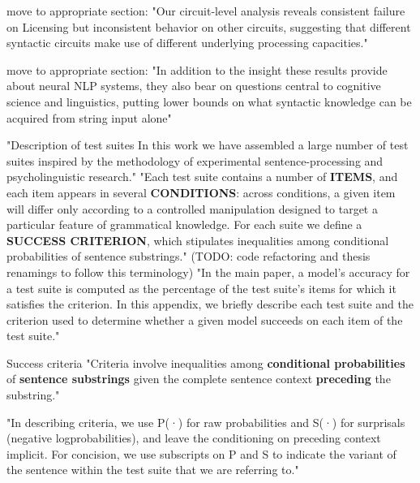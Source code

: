 
move to appropriate section: "Our circuit-level analysis reveals consistent failure on Licensing but inconsistent behavior on other
circuits, suggesting that different syntactic circuits
make use of different underlying processing capacities."  \citep{hu2020systematic} 

move to appropriate section: "In addition to the insight these results provide
about neural NLP systems, they also bear on questions central to cognitive science and linguistics, putting lower bounds on what syntactic knowledge
can be acquired from string input alone"  \citep{hu2020systematic} 

"Description of test suites In this work we have assembled a large number of
test suites inspired by the methodology of experimental sentence-processing and psycholinguistic research." \citep{hu2020systematic} 
"Each test suite contains a number of \textbf{ITEMS}, and each item appears in several \textbf{CONDITIONS}: across conditions, a given item will differ only according to a controlled manipulation designed to target a particular feature of grammatical  knowledge. For each suite we define a \textbf{SUCCESS
	CRITERION}, which stipulates inequalities among conditional probabilities of sentence substrings."\citep{hu2020systematic} 
(TODO: code refactoring and thesis renamings to follow this terminology)
"In the main paper, a model’s accuracy for a test
suite is computed as the percentage of the test
suite’s items for which it satisfies the criterion. In
this appendix, we briefly describe each test suite
and the criterion used to determine whether a given
model succeeds on each item of the test suite." \citep{hu2020systematic} 

Success criteria
"Criteria involve inequalities among \textbf{conditional probabilities} of \textbf{sentence substrings} given the complete sentence context \textbf{preceding} the substring."  \citep{hu2020systematic} 

"In describing criteria, we use P(·) for raw probabilities and S(·) for surprisals (negative logprobabilities), and leave the conditioning on preceding context implicit. For concision, we use subscripts on P and S to indicate the variant of the sentence within the test suite that we are referring to."   \citep{hu2020systematic} 

